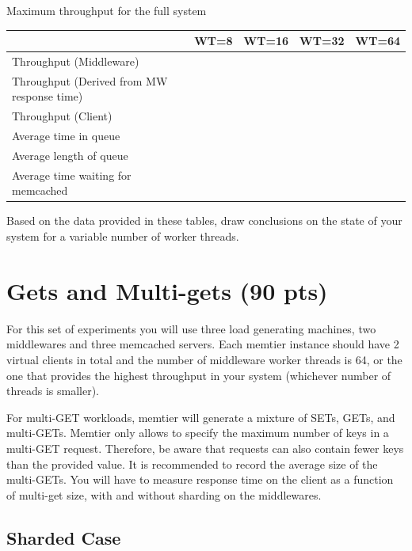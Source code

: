 \documentclass[11pt,a4paper]{article}
\begin{document}
\begin{center}
	{Maximum throughput for the full system}
	\begin{tabular}{|l|p{1.5cm}|p{1.5cm}|p{1.5cm}|p{1.5cm}|}
		\hline                                            & WT=8 & WT=16 & WT=32 & WT=64 \\ 
		\hline Throughput (Middleware)                    &      &       &       &       \\ 
		\hline Throughput (Derived from MW response time) &      &       &       &       \\ 
		\hline Throughput (Client)                        &      &       &       &       \\ 
		\hline Average time in queue                      &      &       &       &       \\ 
		\hline Average length of queue                    &      &       &       &       \\ 
		\hline Average time waiting for memcached         &      &       &       &       \\ 
		\hline 
	\end{tabular}
\end{center}

Based on the data provided in these tables, draw conclusions on the state of your system for a variable number of worker threads.

\section{Gets and Multi-gets (90 pts)}

For this set of experiments you will use three load generating machines, two middlewares and three memcached servers. Each memtier instance should have 2 virtual clients in total and the number of middleware worker threads is 64, or the one that provides the highest throughput in your system (whichever number of threads is smaller).

For multi-GET workloads, memtier will generate a mixture of SETs, GETs, and multi-GETs. Memtier only allows to specify the maximum number of keys in a multi-GET request. Therefore, be aware that requests can also contain fewer keys than the provided value. It is recommended to record the average size of the multi-GETs. You will have to measure response time on the client as a function of multi-get size, with and without sharding on the middlewares.

\subsection{Sharded Case} \label{sec5.1}
\end{document}
